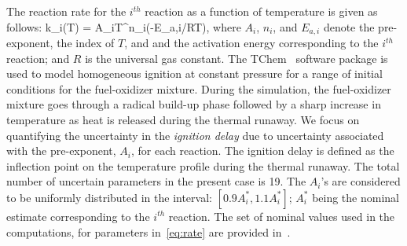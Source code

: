 %
The reaction rate for the $i^{th}$ reaction as a function of temperature
is given as follows:
\be
k_i(T) = A_iT^{n_i}\exp(-E_{a,i}/RT), 
\label{eq:rate}
\ee
%
where $A_i$, $n_i$, and $E_{a,i}$ denote the pre-exponent, the index of $T$, and
and the activation energy corresponding to the $i^{th}$ reaction; and $R$ is the
universal gas constant. 
The TChem~\cite{Safta:2011} software package is used to model homogeneous
ignition at constant pressure for a range of initial conditions for the
fuel-oxidizer mixture. During the simulation, the fuel-oxidizer mixture goes 
through a radical build-up phase followed by a sharp increase in temperature
as heat is released during the thermal runaway. We focus on quantifying the 
uncertainty in the \emph{ignition delay} due to uncertainty associated 
with the pre-exponent, $A_i$, for each reaction. The ignition delay 
is defined as the inflection point on the temperature profile during the thermal
runaway. The total number of uncertain parameters in the
present case is 19.  The $A_i$'s are considered to be uniformly distributed in
the interval: $[0.9A_i^\ast, 1.1A_i^\ast]$; $A_i^\ast$ being the nominal
estimate corresponding to the $i^{th}$ reaction.
The set of nominal values used in the computations, for parameters 
in~\eqref{eq:rate} are provided
in~\cite{Yetter:1991}. 

